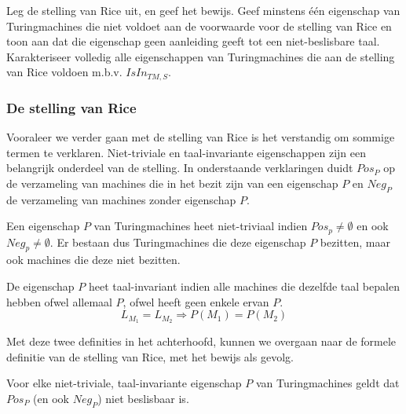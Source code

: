 \begin{question}
	Leg de stelling van Rice uit, en geef het bewijs. Geef minstens \'e\'en eigenschap van Turingmachines die niet voldoet aan de voorwaarde voor de stelling van Rice en toon aan dat die eigenschap geen aanleiding geeft tot een niet-beslisbare taal. Karakteriseer volledig alle eigenschappen van Turingmachines die aan de stelling van Rice voldoen m.b.v. $IsIn_{TM,S}$.
\end{question}

\subsubsection*{De stelling van Rice}

Vooraleer we verder gaan met de stelling van Rice is het verstandig om sommige termen te verklaren. Niet-triviale en taal-invariante eigenschappen zijn een belangrijk onderdeel van de stelling. In onderstaande verklaringen duidt $Pos_P$ op de verzameling van machines die in het bezit zijn van een eigenschap $P$ en $Neg_P$ de verzameling van machines zonder eigenschap $P$.

\begin{theorem}
	Een eigenschap $P$ van Turingmachines heet niet-triviaal indien $Pos_p \neq \emptyset$ en ook $Neg_p \neq \emptyset$. Er bestaan dus Turingmachines die deze eigenschap $P$ bezitten, maar ook machines die deze niet bezitten.
\end{theorem}

\begin{theorem} 
	De eigenschap $P$ heet taal-invariant indien alle machines die dezelfde taal bepalen hebben ofwel allemaal $P$, ofwel heeft geen enkele ervan $P$.
	$$L_{M_1} = L_{M_2} \Rightarrow P(M_1) = P(M_2)$$
\end{theorem}

\noindent Met deze twee definities in het achterhoofd, kunnen we overgaan naar de formele definitie van de stelling van Rice, met het bewijs als gevolg.

\begin{theorem}
	Voor elke niet-triviale, taal-invariante eigenschap $P$ van Turingmachines geldt dat $Pos_P$ (en ook $Neg_P$) niet beslisbaar is.
\end{theorem}

